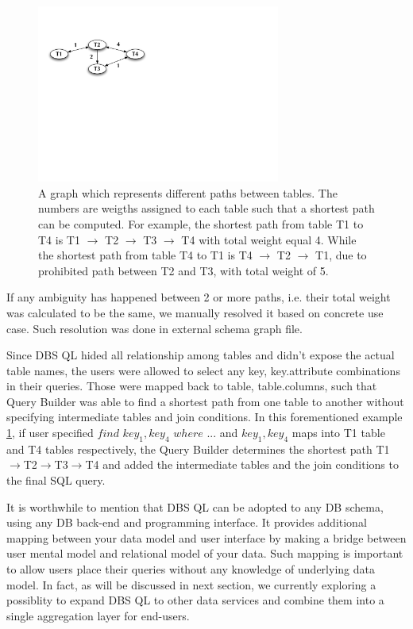 \documentclass[a4paper]{jpconf}
\begin{document}
\begin{figure}[htb]
\centering
\includegraphics[width=80mm]{DBSSql_shortestpath.pdf}
\caption{A graph which represents different paths between tables. The
numbers are weigths assigned to each table such that a shortest path
can be computed. For example, the shortest path from table T1 to T4 is 
T1 $\rightarrow$ T2 $\rightarrow$ T3 $\rightarrow$ T4 with total weight 
equal 4. While the shortest path from table T4 to T1 is 
T4 $\rightarrow$ T2 $\rightarrow$ T1, due to prohibited path
between T2 and T3, with total weight of 5. 
}
\label{ShortestPath}
\end{figure}
If any ambiguity has happened between 2 or more paths, i.e.
their total weight was calculated to be the same, we manually 
resolved it based on concrete use case. 
Such resolution was done in external schema graph file.

Since DBS QL hided all relationship among tables and didn't
expose the actual table names, the users were allowed to
select any key, key.attribute combinations in their queries.
Those were mapped back to table, table.columns, such that
Query Builder was able to find a shortest path
from one table to another without specifying intermediate
tables and join conditions.
In this forementioned example \ref{ShortestPath},
if user specified
$
find\,\, key_1, key_4\,\, where\,\, ...
$
and $key_1, key_4$ maps into T1 table and T4 tables respectively,
the Query Builder determines
the shortest path 
T1$\rightarrow$T2$\rightarrow$T3$\rightarrow$T4 
and added the intermediate tables 
and the join conditions to the final SQL query. 

It is worthwhile to mention that DBS QL can be adopted to
any DB schema, using any DB back-end and programming interface.
It provides additional mapping between your data model and
user interface by making a bridge between user mental model
and relational model of your data. Such mapping is important
to allow users place their queries without any knowledge of
underlying data model. 
In fact, as will be discussed in
next section, we currently exploring a possiblity to
expand DBS QL to other data services and combine them
into a single aggregation layer for end-users.
\end{document}
